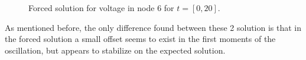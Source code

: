\begin{figure}[H]
\hspace{-10mm}
  \caption{Forced solution for voltage in node 6 for $t=[0,20]$.} 
\end{figure}

As mentioned before, the only difference found between these 2 solution is that in the forced solution a small offset seems to exist in the first moments of the oscillation, but appears to stabilize on the expected solution.

